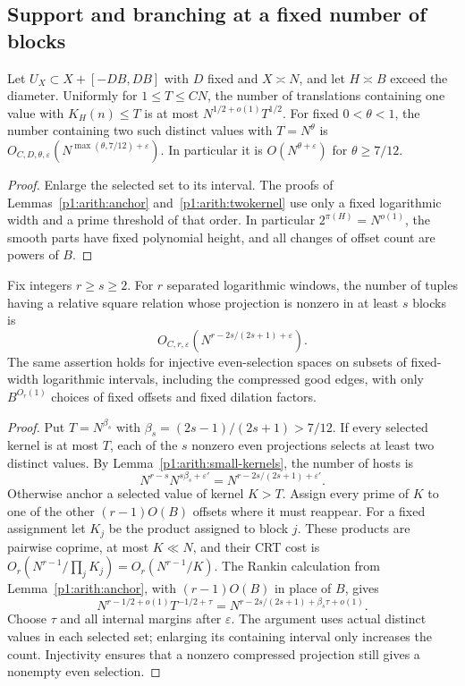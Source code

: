 \subsection{Support and branching at a fixed number of blocks}

\begin{lemma}
\label{p1:arith:small-kernels}
Let $U_X\subset X+[-DB,DB]$ with $D$ fixed and $X\asymp N$, and let
$H\asymp B$ exceed the diameter.  Uniformly for $1\leq T\leq CN$,
the number of translations containing one value with $K_H(n)\leq T$
is at most $N^{1/2+o(1)}T^{1/2}$.  For fixed $0<\theta<1$, the number
containing two such distinct values with $T=N^\theta$ is
$O_{C,D,\theta,\varepsilon}(N^{\max(\theta,7/12)+\varepsilon})$.
In particular it is $O(N^{\theta+\varepsilon})$ for $\theta\geq7/12$.
\end{lemma}

\begin{proof}
Enlarge the selected set to its interval.  The proofs of
Lemmas~\ref{p1:arith:anchor} and~\ref{p1:arith:twokernel} use only a
fixed logarithmic width and a prime threshold of that order.  In particular
$2^{\pi(H)}=N^{o(1)}$, the smooth parts have fixed polynomial height,
and all changes of offset count are powers of $B$.
\end{proof}

\begin{proposition}
\label{p1:arith:fixed-support}
Fix integers $r\geq s\geq2$.  For $r$ separated logarithmic windows,
the number of tuples having a relative square relation whose projection
is nonzero in at least $s$ blocks is
\[
 O_{C,r,\varepsilon}\left(N^{r-2s/(2s+1)+\varepsilon}\right).
\]
The same assertion holds for injective even-selection spaces on subsets
of fixed-width logarithmic intervals, including the compressed good edges,
with only $B^{O_r(1)}$ choices of fixed offsets and fixed dilation factors.
\end{proposition}

\begin{proof}
Put $T=N^{\beta_s}$ with $\beta_s=(2s-1)/(2s+1)>7/12$.
If every selected kernel is at most $T$, each of the $s$ nonzero even
projections selects at least two distinct values.  By
Lemma~\ref{p1:arith:small-kernels}, the number of hosts is
\[
 N^{r-s}N^{s\beta_s+\varepsilon'}
   =N^{r-2s/(2s+1)+\varepsilon'}.
\]
Otherwise anchor a selected value of kernel $K>T$.
Assign every prime of $K$ to one of the other $(r-1)O(B)$ offsets where
it must reappear.  For a fixed assignment let $K_j$ be the product
assigned to block $j$.  These products are pairwise coprime, at most
$K\ll N$, and their CRT cost is
$O_r(N^{r-1}/\prod_jK_j)=O_r(N^{r-1}/K)$.
The Rankin calculation from Lemma~\ref{p1:arith:anchor}, with
$(r-1)O(B)$ in place of $B$, gives
\[
 N^{r-1/2+o(1)}T^{-1/2+\tau}
 =N^{r-2s/(2s+1)+\beta_s\tau+o(1)}.
\]
Choose $\tau$ and all internal margins after $\varepsilon$.
The argument uses actual distinct values in each selected set; enlarging
its containing interval only increases the count.  Injectivity ensures
that a nonzero compressed projection still gives a nonempty even selection.
\end{proof}


